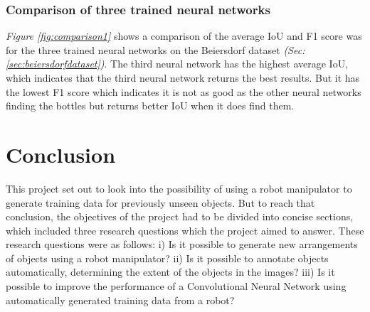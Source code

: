 \subsection{Comparison of three trained neural networks}
\textit{Figure \ref{fig:comparison1}} shows a comparison of the average IoU and F1 score was for the three trained neural networks on the Beiersdorf dataset \textit{(Sec: \ref{sec:beiersdorfdataset})}. The third neural network has the highest average IoU, which indicates that the third neural network returns the best results. But it has the lowest F1 score which indicates it is not as good as the other neural networks finding the bottles but returns better IoU when it does find them.



\clearpage
\chapter{Conclusion}\label{sec:conclusions}
This project set out to look into the possibility of using a robot manipulator to generate training data for previously unseen objects. But to reach that conclusion, the objectives of the project had to be divided into concise sections, which included three research questions which the project aimed to answer. These research questions were as follows: i) Is it possible to generate new arrangements of objects using a robot manipulator? ii) Is it possible to annotate objects automatically, determining the extent of the objects in the images? iii) Is it possible to improve the performance of a Convolutional Neural Network using automatically generated training data from a robot?

